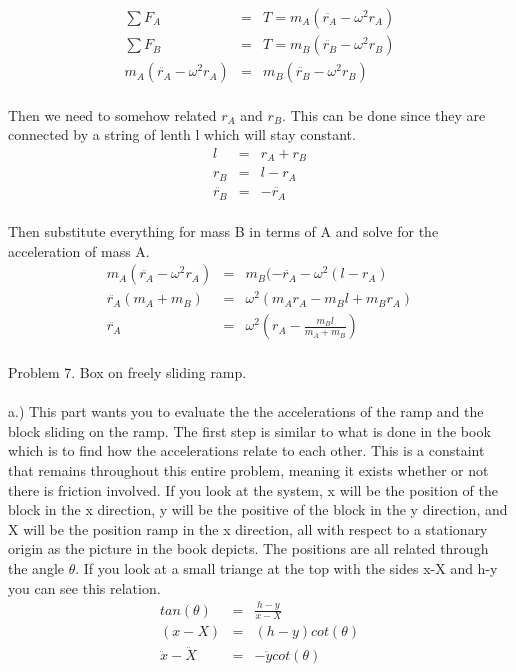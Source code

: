 \documentclass[11pt]{amsart}
\begin{document}
\begin{eqnarray*}
\sum{F_{A}} &=& T = m_{A}(\ddot{r_{A}}-\omega^{2}r_{A}) \\
\sum{F_{B}} &=& T = m_{B}(\ddot{r_{B}}-\omega^{2}r_{B}) \\
 m_{A}(\ddot{r_{A}}-\omega^{2}r_{A})  &=& m_{B}(\ddot{r_{B}}-\omega^{2}r_{B})
\end{eqnarray*} \\
Then we need to somehow related $r_{A}$ and $r_{B}$. This can be done since they are connected by a string of lenth l which will stay constant. \\
\begin{eqnarray*}
l &=& r_{A} +r_{B} \\
r_{B} &=& l-r_{A} \\
\ddot{r_{B}} &=& - \ddot{r_{A}} 
\end{eqnarray*} \\
Then substitute everything for mass B in terms of A and solve for the acceleration of mass A. \\
\begin{eqnarray*} 
 m_{A}(\ddot{r_{A}}-\omega^{2}r_{A})  &=& m_{B}(-\ddot{r_{A}}-\omega^{2}(l-r_{A}) \\
\ddot{r_{A}}(m_{A}+m_{B}) &=& \omega^{2}(m_{A}r_{A}-m_{B}l+m_{B}r_{A}) \\
\ddot{r_{A}} &=& \omega^{2}(r_{A} - \frac{m_{B}l}{m_{A}+m_{B}}) 
\end{eqnarray*} \\ 
Problem 7. Box on freely sliding ramp. \\ \\ 
a.) This part wants you to evaluate the the accelerations of the ramp and the block sliding on the ramp. The first step is similar to what is done in the book which is to find how the accelerations relate to each other. This is a constaint that remains throughout this entire problem, meaning it exists whether or not there is friction involved. If you look at the system, x will be the position of the block in the x direction, y will be the positive of the block in the y direction, and X will be the position ramp in the x direction, all with respect to a stationary origin as the picture in the book depicts. The positions are all related through the angle $\theta$. If you look at a small triange at the top with the sides x-X and h-y you can see this relation. \\
\begin{eqnarray*}
tan(\theta) &=& \frac{h-y}{x-X} \\
(x-X) &=& (h-y)cot(\theta) \\
\ddot{x}-\ddot{X} &=& -\ddot{y}cot(\theta) 
\end{eqnarray*} \\
\end{document}
